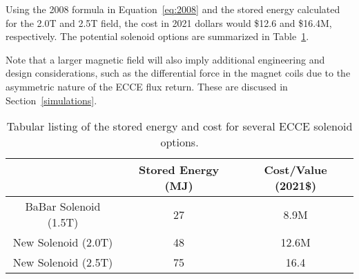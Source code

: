 Using the 2008 formula in Equation~\ref{eq:2008} and the stored energy calculated for the 2.0T and 2.5T field, the cost in 2021 dollars would \$12.6 and \$16.4M, respectively. The potential solenoid options are summarized in Table~\ref{tab:magoptions}. 

Note that a larger magnetic field will also imply additional engineering and design considerations, such as the differential force in the magnet coils due to the asymmetric nature of the ECCE flux return.  These are discused in Section~\ref{simulations}. 

\begin{table}[h!tbp]
    \centering
    \begin{tabular}{| c | c | c |}
        \hline
                         & Stored Energy (MJ) &  Cost/Value (2021\$) \\ [0.5ex]
         \hline
         BaBar Solenoid (1.5T) & 27 & 8.9M \\       
         New Solenoid (2.0T)   & 48 & 12.6M \\
         New Solenoid (2.5T)   & 75 & 16.4 \\
         \hline
    \end{tabular}{}
     \caption{Tabular listing of the stored energy and cost for several ECCE solenoid options.}
    \label{tab:magoptions}
\end{table}


